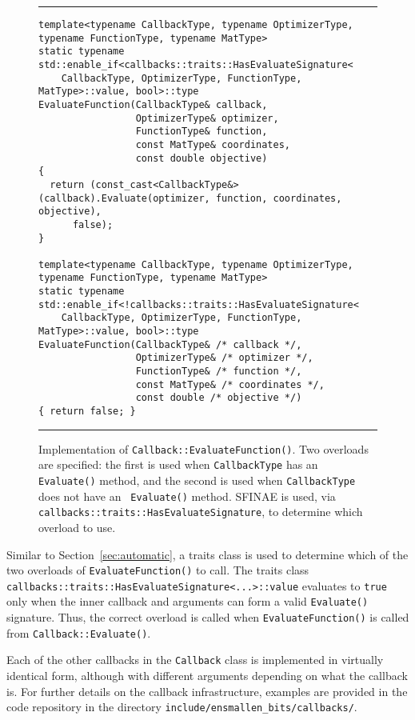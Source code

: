 \begin{figure}[t!]
\hrule
\vspace{1ex}
\begin{verbatim}
template<typename CallbackType, typename OptimizerType, typename FunctionType, typename MatType>
static typename std::enable_if<callbacks::traits::HasEvaluateSignature<
    CallbackType, OptimizerType, FunctionType, MatType>::value, bool>::type
EvaluateFunction(CallbackType& callback,
                 OptimizerType& optimizer,
                 FunctionType& function,
                 const MatType& coordinates,
                 const double objective)
{
  return (const_cast<CallbackType&>(callback).Evaluate(optimizer, function, coordinates, objective),
      false);
}

template<typename CallbackType, typename OptimizerType, typename FunctionType, typename MatType>
static typename std::enable_if<!callbacks::traits::HasEvaluateSignature<
    CallbackType, OptimizerType, FunctionType, MatType>::value, bool>::type
EvaluateFunction(CallbackType& /* callback */,
                 OptimizerType& /* optimizer */,
                 FunctionType& /* function */,
                 const MatType& /* coordinates */,
                 const double /* objective */)
{ return false; }
\end{verbatim}
\hrule
\vspace*{-0.5em}
\label{fig:callback_evaluate_function}
\caption{Implementation of {\tt Callback::EvaluateFunction()}.  Two overloads
are specified: the first is used when {\tt CallbackType} has an {\tt Evaluate()}
method, and the second is used when {\tt CallbackType} does not have an {\tt
Evaluate()} method.  SFINAE is used, via {\tt
callbacks::traits::HasEvaluateSignature}, to determine which overload to use.}
\end{figure}

Similar to Section~\ref{sec:automatic}, a traits class is used to determine
which of the two overloads of {\tt EvaluateFunction()} to call.  The traits
class {\tt callbacks::traits::HasEvaluateSignature<...>::value}
evaluates to {\tt true} only when the inner callback and arguments can form a
valid {\tt Evaluate()} signature.  Thus, the correct overload is called when
{\tt EvaluateFunction()} is called from {\tt Callback::Evaluate()}.

Each of the other callbacks in the {\tt Callback} class is implemented in
virtually identical form, although with different arguments depending on what
the callback is.  For further details on the callback infrastructure,
examples are provided in the code repository in the directory
{\tt include/ensmallen\_bits/callbacks/}.

